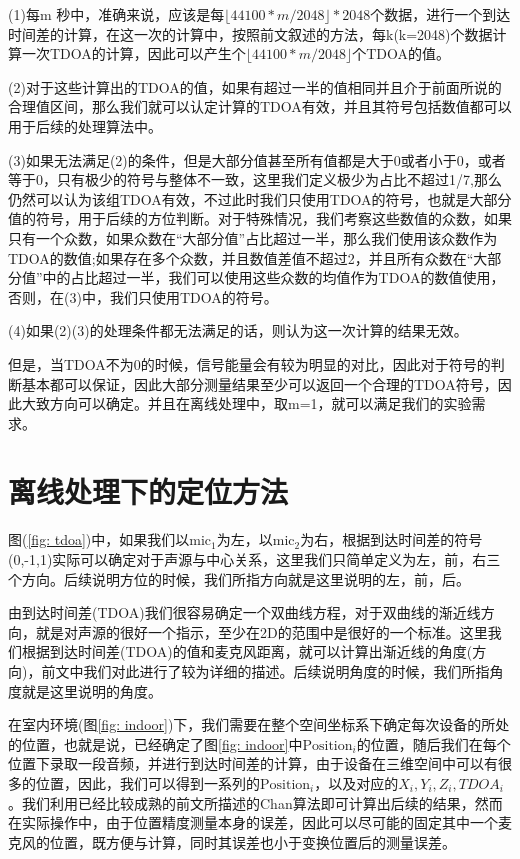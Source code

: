 \documentclass[winfonts,oneside]{njuthesis}
\begin{document}
		(1)每m 秒中，准确来说，应该是每$\lfloor 44100 * m / 2048 \rfloor * 2048 $个数据，进行一个到达时间差的计算，在这一次的计算中，按照前文叙述的方法，每k(k=2048)个数据计算一次TDOA的计算，因此可以产生个$\lfloor 44100 * m / 2048 \rfloor$个TDOA的值。
		
		(2)对于这些计算出的TDOA的值，如果有超过一半的值相同并且介于前面所说的合理值区间，那么我们就可以认定计算的TDOA有效，并且其符号包括数值都可以用于后续的处理算法中。
		
		(3)如果无法满足(2)的条件，但是大部分值甚至所有值都是大于0或者小于0，或者等于0，只有极少的符号与整体不一致，这里我们定义极少为占比不超过1/7,那么仍然可以认为该组TDOA有效，不过此时我们只使用TDOA的符号，也就是大部分值的符号，用于后续的方位判断。对于特殊情况，我们考察这些数值的众数，如果只有一个众数，如果众数在“大部分值”占比超过一半，那么我们使用该众数作为TDOA的数值;如果存在多个众数，并且数值差值不超过2，并且所有众数在“大部分值”中的占比超过一半，我们可以使用这些众数的均值作为TDOA的数值使用，否则，在(3)中，我们只使用TDOA的符号。
		
		(4)如果(2)(3)的处理条件都无法满足的话，则认为这一次计算的结果无效。
		
		但是，当TDOA不为0的时候，信号能量会有较为明显的对比，因此对于符号的判断基本都可以保证，因此大部分测量结果至少可以返回一个合理的TDOA符号，因此大致方向可以确定。并且在离线处理中，取m=1，就可以满足我们的实验需求。
		
	\section{离线处理下的定位方法}
		
		图(\ref{fig: tdoa})中，如果我们以$\text{mic}_1$为左，以$\text{mic}_2$为右，根据到达时间差的符号(0,-1,1)实际可以确定对于声源与中心关系，这里我们只简单定义为左，前，右三个方向。后续说明方位的时候，我们所指方向就是这里说明的左，前，后。
	
		由到达时间差(TDOA)我们很容易确定一个双曲线方程，对于双曲线的渐近线方向，就是对声源的很好一个指示，至少在2D的范围中是很好的一个标准。这里我们根据到达时间差(TDOA)的值和麦克风距离，就可以计算出渐近线的角度(方向)，前文中我们对此进行了较为详细的描述。后续说明角度的时候，我们所指角度就是这里说明的角度。
		
		在室内环境(图\ref{fig: indoor})下，我们需要在整个空间坐标系下确定每次设备的所处的位置，也就是说，已经确定了图\ref{fig: indoor}中$\text{Position}_i$的位置，随后我们在每个位置下录取一段音频，并进行到达时间差的计算，由于设备在三维空间中可以有很多的位置，因此，我们可以得到一系列的$\text{Position}_i$，以及对应的$X_i,Y_i,Z_i,TDOA_i$。我们利用已经比较成熟的前文所描述的Chan算法即可计算出后续的结果，然而在实际操作中，由于位置精度测量本身的误差，因此可以尽可能的固定其中一个麦克风的位置，既方便与计算，同时其误差也小于变换位置后的测量误差。
		
\end{document}
